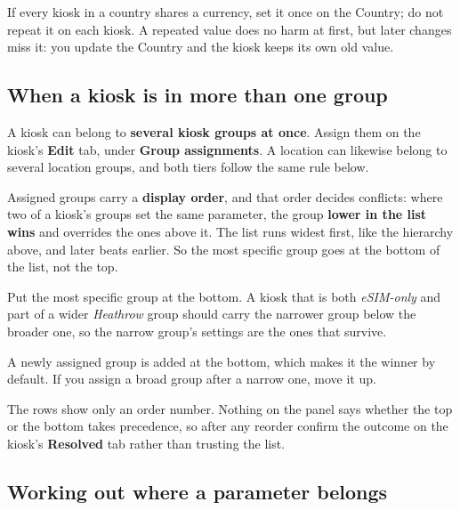 \documentclass[a4paper,10pt]{article}
\begin{document}
\begin{wkinfo}
If every kiosk in a country shares a currency, set it once on the Country;
do not repeat it on each kiosk. A repeated value does no harm at first,
but later changes miss it: you update the Country and the kiosk keeps its
own old value.
\end{wkinfo}

\subsection{When a kiosk is in more than one group}\label{sec:groupsorder}

A kiosk can belong to \textbf{several kiosk groups at once}. Assign them
on the kiosk's \textbf{Edit} tab, under \textbf{Group assignments}. A
location can likewise belong to several location groups, and both tiers
follow the same rule below.

Assigned groups carry a \textbf{display order}, and that order decides
conflicts: where two of a kiosk's groups set the same parameter, the group
\textbf{lower in the list wins} and overrides the ones above it. The list
runs widest first, like the hierarchy above, and later beats earlier. So
the most specific group goes at the bottom of the list, not the top.

\begin{wkinfo}
Put the most specific group at the bottom. A kiosk that is both
\emph{eSIM-only} and part of a wider \emph{Heathrow} group should carry
the narrower group below the broader one, so the narrow group's settings
are the ones that survive.

A newly assigned group is added at the bottom, which makes it the winner
by default. If you assign a broad group after a narrow one, move it up.
\end{wkinfo}

\begin{wkwarn}
The rows show only an order number. Nothing on the panel says whether the
top or the bottom takes precedence, so after any reorder confirm the
outcome on the kiosk's \textbf{Resolved} tab rather than trusting the
list.
\end{wkwarn}

\subsection{Working out where a parameter belongs}
\end{document}
